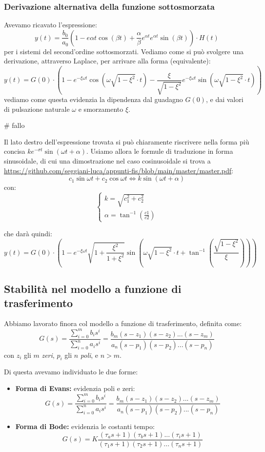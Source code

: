 \documentclass[a4paper,11pt]{article}
\begin{document}
\subsubsection{Derivazione alternativa della funzione sottosmorzata}
Avevamo ricavato l'espressione:
$$
y(t) = \frac{b_0}{a_0} \left( 1 - e{\alpha t} \cos(\beta t) + \frac{\alpha}{\beta} e^{\alpha t} e^{\alpha t} \sin(\beta t) \right) \cdot H(t)
$$
per i sistemi del second'ordine sottosmorzati.
Vediamo come si può svolgere una derivazione, attraverso Laplace, per arrivare alla forma (equivalente):
$$
y(t) = G(0) \cdot \left( 1 - e^{-\xi \omega t} \cos\left(\omega \sqrt{1 - \xi ^2} \cdot t \right) - \frac{\xi}{\sqrt{1 - \xi^2}} e^{-\xi \omega t} \sin\left( \omega \sqrt{1 - \xi^2} \cdot t \right) \right)
$$
vediamo come questa evidenzia la dipendenza dal guadagno $G(0)$, e dai valori di pulsazione naturale $\omega$ e smorzamento $\xi$.

# fallo

Il lato destro dell'espressione trovata si può chiaramente riscrivere nella forma più concisa $ke^{-\sigma t} \sin(\omega t + \alpha)$. 
Usiamo allora le formule di traduzione in forma sinusoidale, di cui una dimostrazione nel caso cosinusoidale si trova a \url{https://github.com/seggiani-luca/appunti-fis/blob/main/master/master.pdf}:
\[
	c_1 \sin{\omega t} + c_2 \cos{\omega t}
	\Leftrightarrow
	k \sin(\omega t + \alpha)
\]
con:
\[
	\begin{cases}
		k 	= \sqrt{c_1^2 + c_2^2} \\ 
		\alpha = \tan^{-1}(\frac{c1}{c2})
	\end{cases}
\]

che darà quindi:
$$
y(t) = G(0) \cdot \left( 1 - e^{-\xi \omega t} \sqrt{1 + \frac{\xi^2}{1 + \xi^2}} \sin\left( \omega \sqrt{1 - \xi^2} \cdot t + \tan^{-1} \left( \frac{\sqrt{1 - \xi^2}}{\xi} \right) \right) \right) 
$$

\subsection{Stabilità nel modello a funzione di trasferimento}
Abbiamo lavorato finora col modello a funzione di trasferimento, definita come:
$$
G(s) = \frac{\sum_{i = 0}^m b_i s^i}{\sum_{i = 0}^n a_i s^i} = \frac{ b_m (s - z_1) (s - z_2) ... (s - z_m) }{ a_n (s - p_1) (s - p_2) ... (s - p_n) }
$$
con $z_i$ gli $m$ \textit{zeri}, $p_i$ gli $n$ \textit{poli}, e $n > m$.

Di questa avevamo individuato le due forme:
\begin{itemize}
	\item \textbf{Forma di Evans:} evidenzia poli e zeri:
		$$
G(s) = \frac{\sum_{i = 0}^m b_i s^i}{\sum_{i = 0}^n a_i s^i} = \frac{ b_m (s - z_1) (s - z_2) ... (s - z_m) }{ a_n (s - p_1) (s - p_2) ... (s - p_n) }
		$$
	\item \textbf{Forma di Bode:} evidenzia le costanti tempo: 
		$$
G(s) = K \frac{ (\tau_a s + 1) (\tau_b s + 1) ... (\tau_i s + 1) }{ (\tau_1 s + 1) (\tau_2 s + 1) ... (\tau_n s + 1) }
		$$
\end{itemize}
\end{document}
